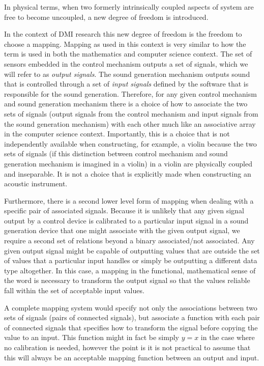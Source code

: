 In physical terms, when two formerly intrinsically coupled aspects of system are free to become uncoupled, a new degree of freedom is introduced.

In the context of DMI research this new degree of freedom is the freedom to choose a mapping. Mapping as used in this context is very similar to how the term is used in both the mathematics and computer science context. The set of sensors embedded in the control mechanism outputs a set of signals, which we will refer to as \emph{output signals}. The sound generation mechanism outputs sound that is controlled through a set of \emph{input signals} defined by the software that is responsible for the sound generation. Therefore, for any given control mechanism and sound generation mechanism there is a choice of how to associate the two sets of signals (output signals from the control mechanism and input signals from the sound generation mechanism) with each other much like an associative array in the computer science context. Importantly, this is a choice that is not independently available when constructing, for example, a violin because the two sets of signals (if this distinction between control mechanism and sound generation mechanism is imagined in a violin) in a violin are physically coupled and inseparable. It is not a choice that is explicitly made when constructing an acoustic instrument.

Furthermore, there is a second lower level form of mapping when dealing with a specific pair of associated signals. Because it is unlikely that any given signal output by a control device is calibrated to a particular input signal in a sound generation device that one might associate with the given output signal, we require a second set of relations beyond a binary associated/not associated. Any given output signal might be capable of outputting values that are outside the set of values that a particular input handles or simply be outputting a different data type altogether. In this case, a mapping in the functional, mathematical sense of the word is necessary to transform the output signal so that the values reliable fall within the set of acceptable input values.

A complete mapping system would specify not only the associations between two sets of signals (pairs of connected signals), but associate a function with each pair of connected signals that specifies how to transform the signal before copying the value to an input. This function might in fact be simply \begin{math}y = x\end{math} in the case where no calibration is needed, however the point is it is not practical to assume that this will always be an acceptable mapping function between an output and input.

